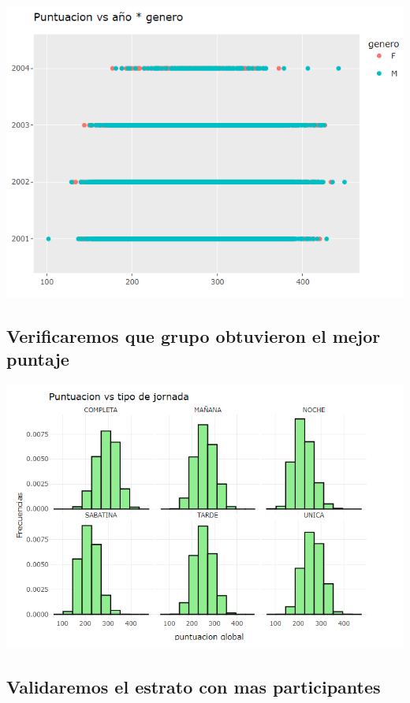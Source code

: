 \documentclass{article}
\begin{document}
\begin{center}
\includegraphics[scale=0.5]{Captura6.PNG} 
\end{center}

\subsection{Verificaremos que grupo obtuvieron el mejor puntaje}

\begin{center}
\includegraphics[scale=0.5]{Captura7.PNG} 
\end{center}

\subsection{Validaremos el estrato con mas participantes}
\end{document}
